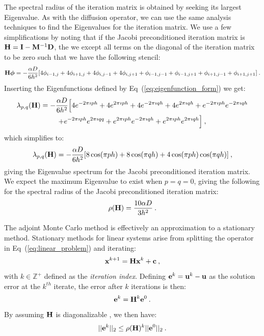 \documentclass{mc2013}
\begin{document}
The spectral radius of the iteration matrix is obtained by seeking its
largest Eigenvalue. As with the diffusion operator, we can use the
same analysis techniques to find the Eigenvalues for the iteration
matrix. We use a few simplifications by noting that if the Jacobi
preconditioned iteration matrix is $\mathbf{H} = \mathbf{I} -
\mathbf{M}^{-1}\mathbf{D}$, the we except all terms on the diagonal of the
iteration matrix to be zero such that we have the following stencil:
\begin{equation}
  \mathbf{H}\boldsymbol{\phi} = -\frac{\alpha D}{6h^2}[4 \phi_{i-1,j}
    + 4 \phi_{i+1,j} + 4 \phi_{i,j-1} + 4 \phi_{i,j+1} +
    \phi_{i-1,j-1} + \phi_{i-1,j+1} + \phi_{i+1,j-1} +
    \phi_{i+1,j+1}]\:.
  \label{eq:iteration_stencil}
\end{equation}
Inserting the Eigenfunctions defined by
Eq~(\ref{eq:eigenfunction_form}) we get:
\begin{multline}
  \lambda_{p,q}(\mathbf{H}) = -\frac{\alpha D}{6h^2}\Big[4 e^{-2 \pi \imath p
      h} + 4 e^{2 \pi \imath p h} + 4 e^{-2 \pi \imath q h} + 4 e^{2
      \pi \imath q h} + e^{-2 \pi \imath p h} e^{-2 \pi \imath q h}
    \\ + e^{-2 \pi \imath p h} e^{2 \pi \imath q q} + e^{2 \pi \imath
      p h} e^{-2 \pi \imath q h} + e^{2 \pi \imath p h} e^{2 \pi
      \imath q h}\Big]\:,
  \label{eq:iteration_deriv}
\end{multline}
which simplifies to:
\begin{equation}
  \lambda_{p,q}(\mathbf{H}) = -\frac{\alpha D}{6h^2}[ 8 \cos(\pi p h) + 8
    \cos(\pi q h) + 4 \cos(\pi p h) \cos(\pi q h)]\:,
  \label{eq:iteration_spectrum}
\end{equation}
giving the Eigenvalue spectrum for the Jacobi preconditioned iteration
matrix. We expect the maximum Eigenvalue to exist when $p=q=0$, giving
the following for the spectral radius of the Jacobi preconditioned
iteration matrix:
\begin{equation}
  \rho(\mathbf{H}) = \frac{10 \alpha D}{3 h^2}\:.
  \label{eq:iteration_radius}
\end{equation}

\label{subsec:neumann_convergence}

The adjoint Monte Carlo method is effectively an approximation to a
stationary method. Stationary methods for linear systems arise from
splitting the operator in Eq~(\ref{eq:linear_problem}) and iterating:
\begin{equation}
  \mathbf{x}^{k+1} = \mathbf{H}\mathbf{x}^k + \mathbf{c}\:,
  \label{eq:linear_iterative_method}
\end{equation}
with $k \in \mathbb{Z}^+$ defined as the \textit{iteration
  index}. Defining $\mathbf{e}^k = \mathbf{u}^k - \mathbf{u}$ as the solution
error at the $k^{th}$ iterate, the error after $k$ iterations is then:
\begin{equation}
  \mathbf{e}^{k} = \mathbf{H}^k\mathbf{e}^0\:. 
  \label{eq:linear_k_iter_error}
\end{equation}
By assuming $\mathbf{H}$ is diagonalizable \cite{leveque_finite_2007}, we
then have:
\begin{equation}
  ||\mathbf{e}^{k}||_2 \leq \rho(\mathbf{H})^k ||\mathbf{e}^0||_2\:.
  \label{eq:linear_k_iter_norm3}
\end{equation}
\end{document}
